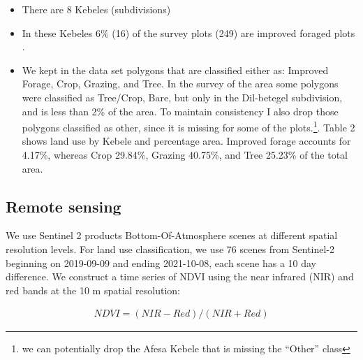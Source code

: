 \documentclass[10pt,a4paper,onecolumn]{article}
\begin{document}
\begin{itemize}
\item There are 8 Kebeles (subdivisions) 
\item In these Kebeles 6\% (16) of the survey plots (249) are improved foraged plots .
\item We kept in the data set polygons that are classified either as: Improved Forage, Crop, Grazing, and Tree. In the survey of the area some polygons were classified as Tree/Crop, Bare, but only in the Dil-betegel subdivision, and is less than 2\% of the area. To maintain consistency I also drop those polygons classified as other, since it is missing for some of the plots.\footnote{we can potentially drop the Afesa Kebele that is missing the ``Other'' class}. Table 2 shows land use by Kebele and percentage area. Improved forage  accounts for   4.17\%, whereas Crop 29.84\%,  Grazing 40.75\%, and Tree  25.23\% of the total area.
\end{itemize}









\subsection{Remote sensing}






We use Sentinel 2 products Bottom-Of-Atmosphere scenes at different spatial resolution levels. For land use classification, we use 76 scenes from Sentinel-2 beginning on 2019-09-09 and ending 2021-10-08, each scene has a 10 day difference. We construct a time series of NDVI using the near infrared (NIR) and red bands at the 10 m spatial resolution:

\begin{align}
NDVI = (NIR - Red) / (NIR + Red)
\end{align}
\end{document}
